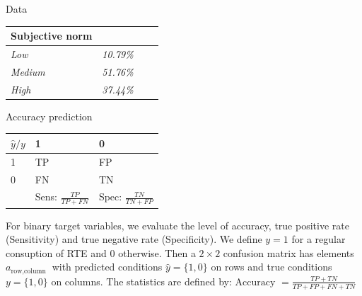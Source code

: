 \documentclass[12pt]{beamer}
\begin{document}
\begin{frame}{Data}
\begin{table}[H]
\begin{tabular}{l|l|l|l}
			\textbf{Subjective norm}          & \textit{}          & \textbf{}                 & \textit{}          \\ \hline
			\textit{Low}                      & \textit{10.79\%}      & \textit{}                                   & \textit{}      \\ \hline
			\textit{Medium}                   & \textit{51.76\%}      & \textit{}                                    & \textit{}      \\ \hline
			\textit{High}                     & \textit{37.44\%}      &                                                & \textit{}          \\ \hline
			
		\end{tabular}
		
		\label{table:statistics}
	\end{table}
\end{frame}
















\begin{frame}{Accuracy prediction}
	\scriptsize
\begin{table}[]
	\begin{tabular}{|l|l|l|}
		\hline
		$\hat{y}/y$ & 1                         & 0                         \\ \hline
		1           & TP                        & FP                        \\ \hline
		0           & FN                        & TN                        \\ \hline
		& Sens: $\frac{TP}{TP+FN}$ & Spec: $\frac{TN}{TN+FP}$ \\ \hline
	\end{tabular}
\end{table}
	
For binary target variables, we evaluate the level of accuracy, true positive rate (Sensitivity) and true negative rate (Specificity). We define  $y=1$ for a regular consuption of RTE and 0 otherwise. Then a $2 \times 2$ confusion matrix has elements $a_{\text {row,column }}$ with predicted conditions $\widehat{y}=\{1,0\}$ on rows and true conditions $y=\{1,0\}$ on columns. The statistics are defined by: $\text{Accuracy }=\frac{TP+TN}{TP+FP+FN+TN}$

\end{frame}
\end{document}
